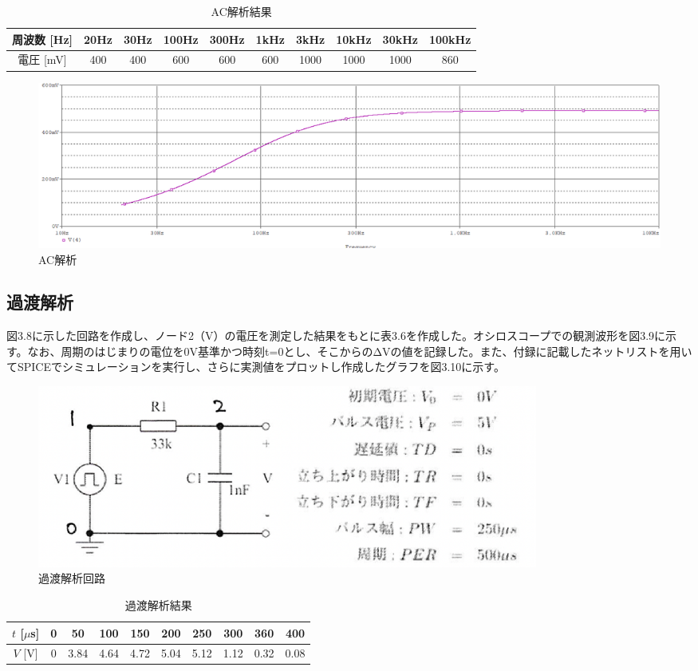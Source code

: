 \documentclass{jlreq}
\numberwithin{equation}{section}
\begin{document}
\begin{table}[H]
  \centering
    \caption{AC解析結果}
    \begin{tabular}{|c|c|c|c|c|c|c|c|c|c|}
      \hline
      周波数 [Hz] & 20Hz & 30Hz & 100Hz & 300Hz & 1kHz & 3kHz & 10kHz & 30kHz & 100kHz \\ \hline
      電圧 [mV] & 400 & 400 & 600 & 600 & 600 & 1000 & 1000 & 1000 & 860 \\ \hline
    \end{tabular}
\end{table}

\begin{figure}[H]
  \centering
  \includegraphics[width=\textwidth]{assets/ackaisekiplot.png}
  \caption{AC解析}
\end{figure}

\subsection{過渡解析}
図3.8に示した回路を作成し、ノード2（V）の電圧を測定した結果をもとに表3.6を作成した。オシロスコープでの観測波形を図3.9に示す。なお、周期のはじまりの電位を0V基準かつ時刻t=0とし、そこからのΔVの値を記録した。また、付録に記載したネットリストを用いてSPICEでシミュレーションを実行し、さらに実測値をプロットし作成したグラフを図3.10に示す。

\begin{figure}[H]
  \centering
  \includegraphics[width=0.8\textwidth]{assets/katokaisekikairo.png}
  \caption{過渡解析回路}
\end{figure}

\begin{table}[H]
  \centering
  \caption{過渡解析結果}
  \begin{tabular}{|c|c|c|c|c|c|c|c|c|c|}
    \hline
    \( t \) [\(\mu\)s] & 0 & 50 & 100 & 150 & 200 & 250 & 300 & 360 & 400 \\ \hline
    \( V \) [V] & 0 & 3.84 & 4.64 & 4.72 & 5.04 & 5.12 & 1.12 & 0.32 & 0.08 \\ \hline
  \end{tabular}
\end{table}
\end{document}
